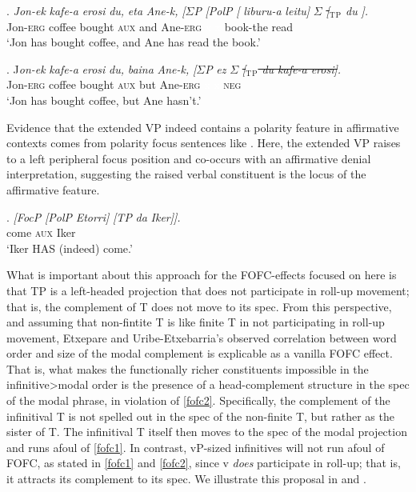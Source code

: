 \documentclass[output=paper]{langscibook}
\begin{document}
\exig. \textit{Jon-ek} \textit{kafe-a} \textit{erosi} \textit{du,} \textit{eta} \textit{Ane-k,} \textit{[$\Sigma$P} \textit{[PolP} \textit{[} \textit{liburu-a} \textit{leitu]} \textit{$\Sigma$} \textit{\st{[$\mathrm{_T}$$\mathrm{_P}$} \textit{du} }\textit{].} \\
	Jon-\textsc{erg} coffee bought \textsc{aux} and Ane-\textsc{erg} \textcolor{white}{x} \textcolor{white}{x} {}
book-the read\\
\vspace*{-.45cm}`Jon has bought coffee, and Ane has read the book.'

\exig. J\textit{on-ek} \textit{kafe-a} \textit{erosi} \textit{du,} \textit{baina} \textit{Ane-k,} \textit{[$\Sigma$P}  \textit{ez} \textit{$\Sigma$} \textit{\st{[$\mathrm{_T}$$\mathrm{_P}$ du kafe-a erosi]}.} \\
	Jon-\textsc{erg} coffee bought \textsc{aux} but Ane-\textsc{erg}  \textcolor{white}{x} \textcolor{white}{x} \textsc{neg} \\ %
	\vspace*{-.45cm}`Jon has bought coffee, but Ane hasn't.'

Evidence that the extended VP indeed contains a polarity feature in affirmative contexts comes from polarity focus sentences like \Next.  Here, the extended VP raises to a left peripheral focus position and co-occurs with an affirmative denial interpretation, suggesting the raised verbal constituent is the locus of the affirmative feature.

\exig. \textit{[FocP} \textit{[PolP} \textit{Etorri]} \textit{[TP} \textit{da} \textit{Iker]].} \\
	{} {} come {} \textsc{aux} Iker\\
	`Iker HAS (indeed) come.' \protect\label{iker}


What is important about this approach for the FOFC-effects focused on here is that TP is a left-headed projection that does not participate in roll-up movement; that is, the complement of T does not move to its spec.  From this perspective, and assuming that non-fintite T is like finite T in not participating in roll-up movement, Etxepare and Uribe-Etxebarria's observed correlation between word order and size of the modal complement is explicable as a vanilla FOFC effect.  That is, what makes the functionally richer constituents impossible in the infinitive>modal order is the presence of a head-complement structure in the spec of the modal phrase, in violation of \protect\ref{fofc2}.  Specifically, the complement of the infinitival T is not spelled out in the spec of the non-finite T, but rather as the sister of T.  The infinitival T itself then moves to the spec of the modal projection and runs afoul of \protect\ref{fofc1}. In contrast, vP-sized infinitives will not run afoul of FOFC, as stated in \protect\ref{fofc1} and \protect\ref{fofc2}, since v \textit{does} participate in roll-up; that is, it attracts its complement to its spec. We illustrate this proposal in \Next and \NNext.
\end{document}
